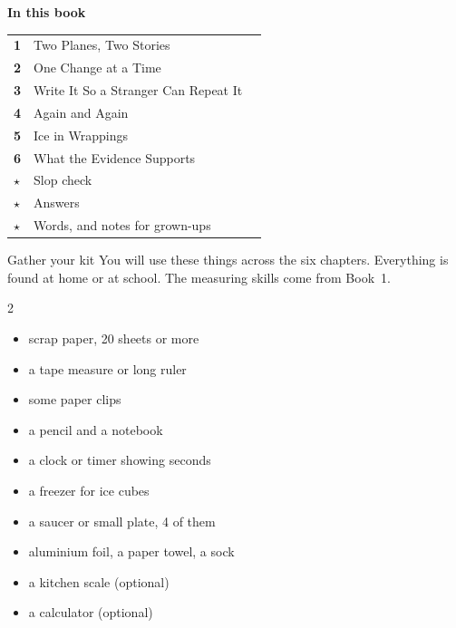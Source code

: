 \thispagestyle{plain}
{\sans\bfseries\LARGE\color{ink} In this book}\par\vspace{0.2cm}
{\sans\large
\begin{tabular}{@{}p{0.9cm}p{7.6cm}r@{}}
\textcolor{tangerine}{\bfseries 1} & Two Planes, Two Stories & \pageref{ch1}\\[3pt]
\textcolor{tangerine}{\bfseries 2} & One Change at a Time & \pageref{ch2}\\[3pt]
\textcolor{tangerine}{\bfseries 3} & Write It So a Stranger Can Repeat It & \pageref{ch3}\\[3pt]
\textcolor{tangerine}{\bfseries 4} & Again and Again & \pageref{ch4}\\[3pt]
\textcolor{tangerine}{\bfseries 5} & Ice in Wrappings & \pageref{ch5}\\[3pt]
\textcolor{tangerine}{\bfseries 6} & What the Evidence Supports & \pageref{ch6}\\[3pt]
\textcolor{sky}{\bfseries $\star$} & Slop check & \pageref{slop}\\[3pt]
\textcolor{sky}{\bfseries $\star$} & Answers & \pageref{answers}\\[3pt]
\textcolor{sky}{\bfseries $\star$} & Words, and notes for grown-ups & \pageref{notes}\\
\end{tabular}}

\begin{tryit}{Gather your kit}
You will use these things across the six chapters. Everything is found at home or at school. The measuring skills come from Book~1.
\begin{multicols}{2}
\begin{itemize}[leftmargin=1.2em]
\item scrap paper, 20 sheets or more
\item a tape measure or long ruler
\item some paper clips
\item a pencil and a notebook
\item a clock or timer showing seconds
\item a freezer for ice cubes
\item a saucer or small plate, 4 of them
\item aluminium foil, a paper towel, a sock
\item a kitchen scale (optional)
\item a calculator (optional)
\end{itemize}
\end{multicols}
\end{tryit}

